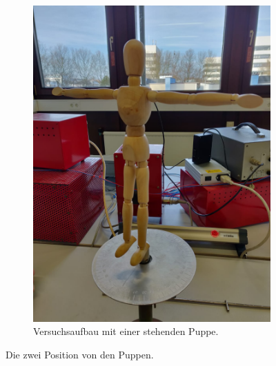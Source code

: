 \begin{figure}
\begin{subfigure}{0.5\textwidth}
    \includegraphics[scale=0.1]{content/data/PuppeTPose2.png}
    \caption{Versuchsaufbau mit einer stehenden Puppe.}
    \label{fig:puppetpose}
\end{subfigure}
\caption{Die zwei Position von den Puppen.}
\label{fig:puppen}
\end{figure}
\FloatBarrier

